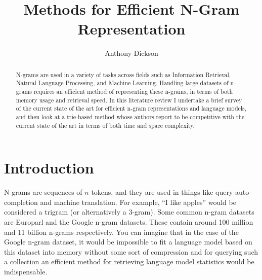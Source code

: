 \documentclass[sigconf, nonacm=true]{acmart}
\begin{document}
%
\title{Methods for Efficient N-Gram Representation}

%
\author{Anthony Dickson}

%
\begin{abstract}
N-grams are used in a variety of tasks across fields such as Information Retrieval, Natural Language Processing, and Machine Learning. Handling large datasets of n-grams requires an efficient method of representing these n-grams, in terms of both memory usage and retrieval speed. In this literature review I undertake a brief survey of the current state of the art for efficient n-gram representations and language models, and then look at a trie-based method whose authors report to be competitive with the current state of the art in terms of both time and space complexity.
\end{abstract}

%
\maketitle

\section{Introduction}

N-grams are sequences of $n$ tokens, and they are used in things like query auto-completion and machine translation. For example, ``I like apples'' would be considered a trigram (or alternatively a 3-gram). Some common n-gram datasets are Europarl and the Google n-gram datasets. These contain around 100 million and 11 billion n-grams respectively. You can imagine that in the case of the Google n-gram dataset, it would be impossible to fit a language model based on this dataset into memory without some sort of compression and for querying such a collection an efficient method for retrieving language model statistics would be indispensable.
\end{document}
